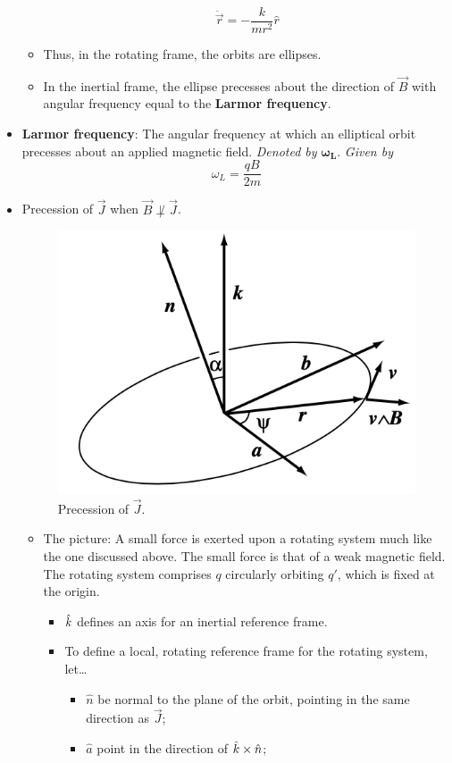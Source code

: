 \documentclass[../notes.tex]{subfiles}
\begin{document}
\begin{itemize}
\begin{itemize}
        \begin{equation*}
            \ddot{\vec{r}} = -\frac{k}{mr^2}\hat{r}
        \end{equation*}
        \item Thus, in the rotating frame, the orbits are ellipses.
        \item In the inertial frame, the ellipse precesses about the direction of $\vec{B}$ with angular frequency equal to the \textbf{Larmor frequency}.
    \end{itemize}
    \item \textbf{Larmor frequency}: The angular frequency at which an elliptical orbit precesses about an applied magnetic field. \emph{Denoted by} $\bm{\omega_L}$. \emph{Given by}
    \begin{equation*}
        \omega_L = \frac{qB}{2m}
    \end{equation*}
    \item Precession of $\vec{J}$ when $\vec{B}\not\perp\vec{J}$.
    \begin{figure}[h!]
        \centering
        \includegraphics[width=0.35\linewidth]{../ExtFiles/Jprecession.png}
        \caption{Precession of $\vec{J}$.}
        \label{fig:Jprecession}
    \end{figure}
    \begin{itemize}
        \item The picture: A small force is exerted upon a rotating system much like the one discussed above. The small force is that of a weak magnetic field. The rotating system comprises $q$ circularly orbiting $q'$, which is fixed at the origin.
        \begin{itemize}
            \item $\hat{k}$ defines an axis for an inertial reference frame.
            \item To define a local, rotating reference frame for the rotating system, let\dots
            \begin{itemize}
                \item $\hat{n}$ be normal to the plane of the orbit, pointing in the same direction as $\vec{J}$;
                \item $\hat{a}$ point in the direction of $\hat{k}\times\hat{n}$;

\end{itemize}
\end{itemize}
\end{itemize}
\end{itemize}
\end{document}
